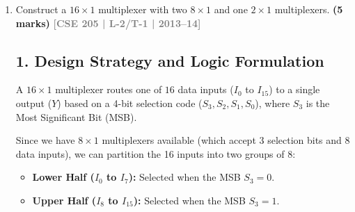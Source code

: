\documentclass[12pt,a3paper]{article}
\newcommand{\yr}[1]{\hfill\textcolor{gray}{\small\textbf{[#1]}}}
\newcommand{\mk}[1]{\textcolor{orange!70!black}{\small\textbf{(#1 marks)}}}
\begin{document}
\begin{enumerate}
\begin{tcolorbox}[enhanced,breakable,ansbox,colback=cD!4,colframe=cD,boxrule=0.8pt,arc=5pt,title={\textbf{Answer}},fonttitle=\bfseries\color{white},colbacktitle=cD]
\textbf{Group Extractions:}
\begin{itemize}
    \item \textbf{Red / $2 \times 2$ Block ($m_6, m_7, m_{14}, m_{15}$):} Variables $A$ and $D$ change, leaving $\mathbf{BC}$.
    \item \textbf{Green / Horizontal Pair ($m_9, m_{11}$):} Variable $C$ changes, leaving $\mathbf{AB'D}$.
    \item \textbf{Blue / Edge Pair ($m_{12}, m_{14}$):} Variable $C$ changes, leaving $\mathbf{ABD'}$.
    \item \textbf{Yellow / Isolated Cell ($m_0$):} No variables change, leaving $\mathbf{A'B'C'D'}$.
\end{itemize}

\vspace{0.2cm}
\textbf{Final Minimal Boolean Function:}
\begin{align*}
    \textcolor{cD}{\mathbf{F(A,B,C,D) = BC + AB'D + ABD' + A'B'C'D'}}
\end{align*}

\end{tcolorbox}

\item Construct a $16 \times 1$ multiplexer with two $8 \times 1$ and one $2 \times 1$ multiplexers.
\mk{5} \yr{CSE 205 | L-2/T-1 | 2013--14}

\begin{tcolorbox}[enhanced,breakable,ansbox,colback=cD!4,colframe=cD,boxrule=0.8pt,arc=5pt,title={\textbf{Answer}},fonttitle=\bfseries\color{white},colbacktitle=cD]

\subsection*{1. Design Strategy and Logic Formulation}
A $16 \times 1$ multiplexer routes one of $16$ data inputs ($I_0$ to $I_{15}$) to a single output ($Y$) based on a 4-bit selection code ($S_3, S_2, S_1, S_0$), where $S_3$ is the Most Significant Bit (MSB).

Since we have $8 \times 1$ multiplexers available (which accept 3 selection bits and 8 data inputs), we can partition the 16 inputs into two groups of 8:
\begin{itemize}
    \item \textbf{Lower Half ($I_0$ to $I_7$):} Selected when the MSB $S_3 = 0$.
    \item \textbf{Upper Half ($I_8$ to $I_{15}$):} Selected when the MSB $S_3 = 1$.
\end{itemize}


\end{tcolorbox}
\end{enumerate}
\end{document}
